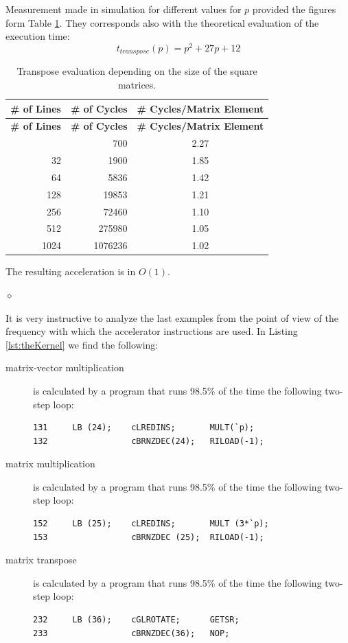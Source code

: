 \begin{exemplu}
Measurement made in simulation for different values for $p$ provided the figures form Table \ref{tab:transPerformance}. They corresponds also with the theoretical evaluation of the execution time:
$$t_{transpose}(p) = p^2 + 27p + 12 $$

{\small
{\centering
\begin{longtable}{|r|r|c|}
\caption{Transpose evaluation depending on the size of the square matrices.}
\label{tab:transPerformance} \\
\hline
\textbf{\# of Lines} & \textbf{\# of Cycles} & \textbf{\# Cycles/Matrix Element} \\
\hline
\endfirsthead
\hline
\textbf{\# of Lines} & \textbf{\# of Cycles} & \textbf{\# Cycles/Matrix Element} \\
\hline
\endhead
\hline
\endfoot
\hline
\endlastfoot
	    16 	&   	700	 &	2.27 		\\ \hline
	    32 	&      1900  &	1.85       \\ \hline
	    64 	&      5836  &	1.42       \\ \hline
	   128 	&     19853  &	1.21       \\ \hline
	   256 	&     72460	 &	1.10		\\ \hline
	   512	&    275980	 &	1.05		\\ \hline
	  1024	&   1076236	 &	1.02		\\ \hline	
\end{longtable}
}}
The resulting acceleration is in $O(1)$.

$\diamond$
\end{exemplu}

It is very instructive to analyze the last examples from the point of view of the frequency with which the accelerator instructions are used. In Listing \ref{lst:theKernel} we find the following:
\begin{description}
\item[matrix-vector multiplication] is calculated by a program that runs 98.5\% of the time the following two-step loop:
\begin{verbatim}
131     LB (24);    cLREDINS;       MULT(`p);
132                 cBRNZDEC(24);   RILOAD(-1);
\end{verbatim}

\item[matrix multiplication] is calculated by a program that runs 98.5\% of the time the following two-step loop:
\begin{verbatim}
152     LB (25);    cLREDINS;       MULT (3*`p);
153                 cBRNZDEC (25);  RILOAD(-1);
\end{verbatim}

\item[matrix transpose] is calculated by a program that runs 98.5\% of the time the following two-step loop:
\begin{verbatim}
232     LB (36);    cGLROTATE;      GETSR;
233                 cBRNZDEC(36);   NOP;
\end{verbatim}

\end{description}